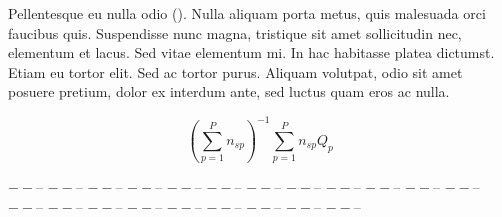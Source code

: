 \documentclass[11pt]{article}
\begin{document}
Pellentesque eu nulla odio (\citealt{Xiao2015,CookEtAl2015}). Nulla aliquam porta metus, quis malesuada orci faucibus quis. Suspendisse nunc magna, tristique sit amet sollicitudin nec, elementum et lacus. Sed vitae elementum mi. In hac habitasse platea dictumst. Etiam eu tortor elit. Sed ac tortor purus. Aliquam volutpat, odio sit amet posuere pretium, dolor ex interdum ante, sed luctus quam eros ac nulla.

\begin{equation}
{ (\sum \limits_{p=1}^P {n_{sp}})^{-1}\sum \limits_{p=1}^P {n_{sp}Q_{p}}}
\end{equation}

\newpage{}

$-- %
$-- %
$-- %
$-- %
$-- %
$-- %
$-- %
$-- %
$-- %
$-- %
$-- %
$-- %
$-- %
$-- %
$-- %
$-- %
$-- %
$-- %
$-- %
$-- %
$-- %
$-- %
$-- %
$-- %
$-- %
$-- %
$-- %
$-- %
$-- %
$-- %
$-- %
$-- %
$-- %
$-- %
$-- %
$-- %
$-- %
$-- %
$-- %
$-- %
$-- %
$-- %
\end{document}
